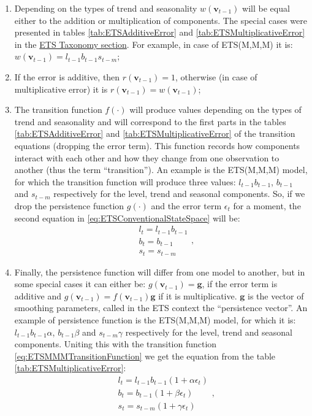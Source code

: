 \documentclass[
]{book}
\providecommand{\tightlist}{%
  \setlength{\itemsep}{0pt}\setlength{\parskip}{0pt}}
\theoremstyle{definition}
\theoremstyle{definition}
\theoremstyle{definition}
\theoremstyle{definition}
\theoremstyle{remark}
\begin{document}
\begin{enumerate}
\def\labelenumi{\arabic{enumi}.}
\tightlist
\item
  Depending on the types of trend and seasonality \(w(\mathbf{v}_{t-1})\) will be equal either to the addition or multiplication of components. The special cases were presented in tables \ref{tab:ETSAdditiveError} and \ref{tab:ETSMultiplicativeError} in the \protect\hyperlink{ETSTaxonomyMaths}{ETS Taxonomy section}. For example, in case of ETS(M,M,M) it is: \(w(\mathbf{v}_{t-1}) = l_{t-1} b_{t-1} s_{t-m}\);
\item
  If the error is additive, then \(r(\mathbf{v}_{t-1})=1\), otherwise (in case of multiplicative error) it is \(r(\mathbf{v}_{t-1})=w(\mathbf{v}_{t-1})\);
\item
  The transition function \(f(\cdot)\) will produce values depending on the types of trend and seasonality and will correspond to the first parts in the tables \ref{tab:ETSAdditiveError} and \ref{tab:ETSMultiplicativeError} of the transition equations (dropping the error term). This function records how components interact with each other and how they change from one observation to another (thus the term ``transition''). An example is the ETS(M,M,M) model, for which the transition function will produce three values: \(l_{t-1}b_{t-1}\), \(b_{t-1}\) and \(s_{t-m}\) respectively for the level, trend and seasonal components. So, if we drop the persistence function \(g(\cdot)\) and the error term \(\epsilon_t\) for a moment, the second equation in \eqref{eq:ETSConventionalStateSpace} will be:
  \begin{equation}
    \begin{aligned}
    & {l}_{t} = l_{t-1} b_{t-1} \\
    & b_t = b_{t-1} \\
    & s_t = s_{t-m}
    \end{aligned},
    \label{eq:ETSMMMTransitionFunction}
  \end{equation}
\item
  Finally, the persistence function will differ from one model to another, but in some special cases it can either be: \(g(\mathbf{v}_{t-1})=\mathbf{g}\), if the error term is additive and \(g(\mathbf{v}_{t-1})=f(\mathbf{v}_{t-1})\mathbf{g}\) if it is multiplicative. \(\mathbf{g}\) is the vector of smoothing parameters, called in the ETS context the ``persistence vector''. An example of persistence function is the ETS(M,M,M) model, for which it is: \(l_{t-1}b_{t-1}\alpha\), \(b_{t-1}\beta\) and \(s_{t-m}\gamma\) respectively for the level, trend and seasonal components. Uniting this with the transition function \eqref{eq:ETSMMMTransitionFunction} we get the equation from the table \ref{tab:ETSMultiplicativeError}:
  \begin{equation}
    \begin{aligned}
    & {l}_{t} = l_{t-1}b_{t-1} (1+\alpha\epsilon_t)\\
    & b_t = b_{t-1} (1+\beta\epsilon_t)\\
    & s_t = s_{t-m} (1+\gamma\epsilon_t)
    \end{aligned},
    \label{eq:ETSMMMTransitionEquation}
  \end{equation}
\end{enumerate}
\end{document}
